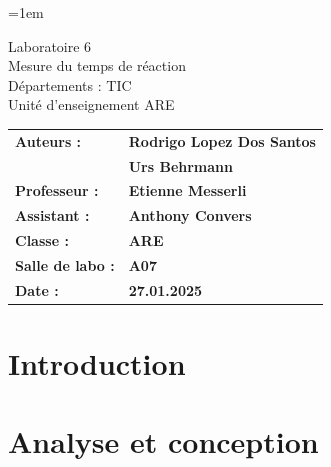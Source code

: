 \documentclass[a4paper,12pt]{article}
\author{Rodrigo Lopez Dos Santos, Urs Behrmann}
\begin{document}
\emergencystretch=1em %

\thispagestyle{firstpage}


\vspace*{2cm}
\begin{center}
    \Huge Laboratoire 6 \\
    \vspace{0.2cm}
    \Large Mesure du temps de réaction\\
    \vspace{1cm}
    \small Départements : TIC\\
    Unité d'enseignement ARE\\
\end{center}

\vspace{9cm}

\renewcommand{\arraystretch}{1.5} %

\begin{flushleft} %
    \begin{tabular}{@{}l l@{}}
        \textbf{Auteurs :}       & \textbf{Rodrigo Lopez Dos Santos} \\
                                 & \textbf{Urs Behrmann} \\
        \textbf{Professeur :}    & \textbf{Etienne Messerli} \\
        \textbf{Assistant :}     & \textbf{Anthony Convers} \\
        \textbf{Classe :}        & \textbf{ARE} \\
        \textbf{Salle de labo :} & \textbf{A07} \\
        \textbf{Date :}          & \textbf{27.01.2025} \\
    \end{tabular}
\end{flushleft}

\newpage

\pagestyle{otherpages}

\tableofcontents

\newpage

\section{Introduction}

\break

\section{Analyse et conception}
\end{document}
